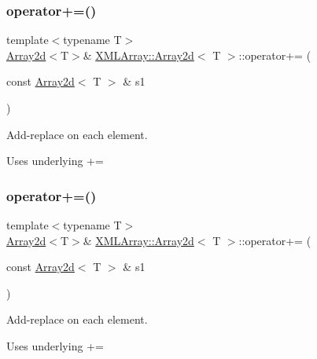 \subsubsection{\texorpdfstring{operator+=()}{operator+=()}\hspace{0.1cm}{\footnotesize\ttfamily [2/3]}}
{\footnotesize\ttfamily template$<$typename T$>$ \\
\mbox{\hyperlink{classXMLArray_1_1Array2d}{Array2d}}$<$T$>$\& \mbox{\hyperlink{classXMLArray_1_1Array2d}{X\+M\+L\+Array\+::\+Array2d}}$<$ T $>$\+::operator+= (\begin{DoxyParamCaption}\item[{const \mbox{\hyperlink{classXMLArray_1_1Array2d}{Array2d}}$<$ T $>$ \&}]{s1 }\end{DoxyParamCaption})\hspace{0.3cm}{\ttfamily [inline]}}



Add-\/replace on each element. 

Uses underlying += \mbox{\label{classXMLArray_1_1Array2d_a1e4469713c271b4d9c02ac881cdf00dd}} 
\subsubsection{\texorpdfstring{operator+=()}{operator+=()}\hspace{0.1cm}{\footnotesize\ttfamily [3/3]}}
{\footnotesize\ttfamily template$<$typename T$>$ \\
\mbox{\hyperlink{classXMLArray_1_1Array2d}{Array2d}}$<$T$>$\& \mbox{\hyperlink{classXMLArray_1_1Array2d}{X\+M\+L\+Array\+::\+Array2d}}$<$ T $>$\+::operator+= (\begin{DoxyParamCaption}\item[{const \mbox{\hyperlink{classXMLArray_1_1Array2d}{Array2d}}$<$ T $>$ \&}]{s1 }\end{DoxyParamCaption})\hspace{0.3cm}{\ttfamily [inline]}}



Add-\/replace on each element. 

Uses underlying += \mbox{\label{classXMLArray_1_1Array2d_a650034573254ebdd7c914d68a498e2c9}} 
